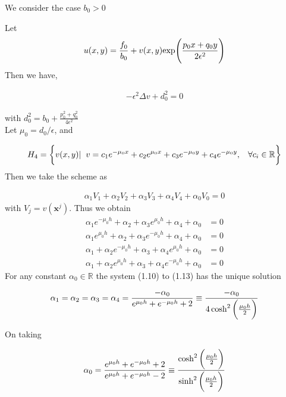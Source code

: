 We consider the case $ b_{0}>0$

Let
\begin{align}
 u(x,y) = \frac{f_{0}}{b_{0}} + v(x,y)\text{exp} \Bigg{(}\frac{p_{0}x + q_{0}y}{2 \epsilon^2}\Bigg{)}
\end{align}
Then we have,

\begin{align}
 -\epsilon^{2} \Delta{v} + d^{2}_{0} = 0
\end{align}

with $d^{2}_{0} = b_{0} + \frac{p_{0}^{2}+q_{0}^{2}}{4 \epsilon^2} $\\
Let $\mu_{0} = d_{0}/\epsilon$, and

\begin{align*}
 H_{4} = \bigg{\{} v(x,y)|\hspace{2mm}v =  c_{1}e^{-\mu_{0}x} + c_{2}e^{\mu_{0}x} + c_{3}e^{-\mu_{0}y} + c_{4}e^{-\mu_{0}y},\hspace{3mm} \forall c_{i} \in \mathbb{R} \bigg{\}}
\end{align*}
Then we take the scheme as

\begin{align}
 \alpha_{1}V_{1} + \alpha_{2}V_{2} + \alpha_{3}V_{3} + \alpha_{4}V_{4} + \alpha_{0}V_{0} = 0
\end{align}
with $V_{j} = v(\textbf{x}^{j})$. Thus we obtain
\begin{align}
 \alpha_{1}e^{-\mu_{0}h} + \alpha_{2} + \alpha_{3}e^{\mu_{0}h} + \alpha_{4}+\alpha_{0} &= 0\\
 \alpha_{1}e^{\mu_{0}h} + \alpha_{2} + \alpha_{3}e^{-\mu_{0}h} + \alpha_{4}+\alpha_{0}&= 0\\
 \alpha_{1} + \alpha_{2}e^{-\mu_{0}h} + \alpha_{3} + \alpha_{4}e^{\mu_{0}h}+\alpha_{0}&= 0\\
 \alpha_{1} + \alpha_{2}e^{\mu_{0}h} + \alpha_{3} + \alpha_{4}e^{-\mu_{0}h}+\alpha_{0} &= 0
\end{align}
For any constant $\alpha_{0} \in \mathbb{R}$ the system (1.10) to (1.13) has the unique solution

\begin{align}
 \alpha_{1} = \alpha_{2} = \alpha_{3} = \alpha_{4} = \frac{-\alpha_{0} }{e^{\mu_{0}h}+e^{-\mu_{0}h}+2} \equiv \frac{-\alpha_{0}}{4\cosh^2\bigg{(}\frac{\mu_{0}h}{2}\bigg{)}}     
\end{align}

On taking

\begin{align}
 \alpha_{0} = \frac{e^{\mu_{0}h}+e^{-\mu_{0}h}+2}{e^{\mu_{0}h}+e^{-\mu_{0}h}-2} \equiv \frac{\cosh^2\bigg{(}\frac{\mu_{0}h}{2}\bigg{)}}{\sinh^2\bigg{(}\frac{\mu_{0}h}{2}\bigg{)}}
\end{align}

